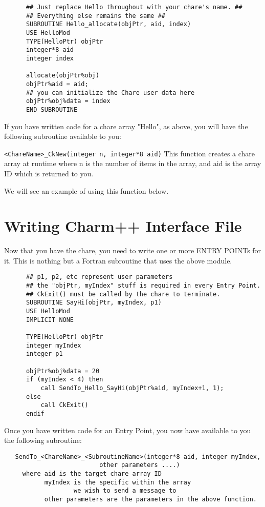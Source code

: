 \documentclass[11pt]{article}
\begin{document}
\begin{verbatim}
      ## Just replace Hello throughout with your chare's name. ##
      ## Everything else remains the same ##
      SUBROUTINE Hello_allocate(objPtr, aid, index)
      USE HelloMod
      TYPE(HelloPtr) objPtr 
      integer*8 aid
      integer index

      allocate(objPtr%obj)
      objPtr%aid = aid;
      ## you can initialize the Chare user data here
      objPtr%obj%data = index
      END SUBROUTINE
\end{verbatim}

If you have written code for a chare array "Hello", as above, you will
have the following subroutine available to you:

  \verb+<ChareName>_CkNew(integer n, integer*8 aid)+
     This function creates a chare array at runtime
     where n is the number of items in the array, and
           aid is the array ID which is returned to you.

We will see an example of using this function below.

\section{Writing Charm++ Interface File}

Now that you have the chare, you need to write one or more ENTRY
POINTs for it.  This is nothing but a Fortran subroutine that uses the
above module.
\begin{verbatim}
      ## p1, p2, etc represent user parameters
      ## the "objPtr, myIndex" stuff is required in every Entry Point.
      ## CkExit() must be called by the chare to terminate.
      SUBROUTINE SayHi(objPtr, myIndex, p1)
      USE HelloMod
      IMPLICIT NONE

      TYPE(HelloPtr) objPtr
      integer myIndex
      integer p1

      objPtr%obj%data = 20
      if (myIndex < 4) then
          call SendTo_Hello_SayHi(objPtr%aid, myIndex+1, 1);
      else 
          call CkExit()
      endif
\end{verbatim}
Once you have written code for an Entry Point, you now have available
to you the following subroutine:
\begin{verbatim}
   SendTo_<ChareName>_<SubroutineName>(integer*8 aid, integer myIndex,
                          other parameters ....)
     where aid is the target chare array ID
           myIndex is the specific within the array
                   we wish to send a message to
           other parameters are the parameters in the above function.
\end{verbatim}
\end{document}
